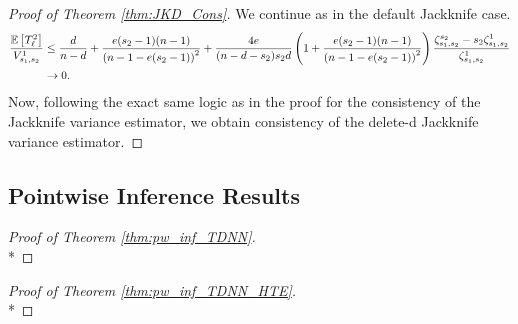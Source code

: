 \begin{proof}[Proof of Theorem \ref{thm:JKD_Cons}]
	We continue as in the default Jackknife case.
	\begin{equation}
		\begin{aligned}
			\frac{\mathbb{E}\left[T_{\ell}^2\right]}{V_{s_1, s_2}^{1}}
			 & \leq \frac{d}{n - d} + \frac{e (s_2 - 1)(n - 1)}{\left(n - 1 - e (s_2 - 1)\right)^2}
			+ \frac{4e}{(n - d - s_2)s_2 d}\left(1 + \frac{e (s_2 - 1)(n - 1)}{\left(n - 1 - e (s_2 - 1)\right)^2}\right) \frac{\zeta_{s_1, s_2}^{s_2} - s_2 \zeta_{s_1, s_2}^{1}}{\zeta_{s_1, s_2}^{1}} \\
			 & \rightarrow 0.
		\end{aligned}
	\end{equation}
	Now, following the exact same logic as in the proof for the consistency of the Jackknife variance estimator, we obtain consistency of the delete-d Jackknife variance estimator.
\end{proof}

\newpage
\subsection{Pointwise Inference Results}

\begin{proof}[Proof of Theorem \ref{thm:pw_inf_TDNN}]\mbox{}\\*

\end{proof}

\begin{proof}[Proof of Theorem \ref{thm:pw_inf_TDNN_HTE}]\mbox{}\\*

\end{proof}
